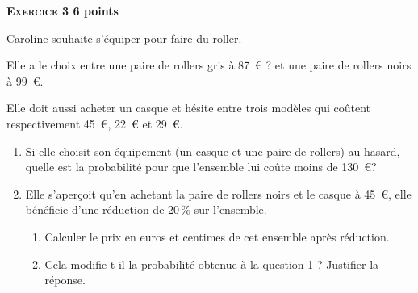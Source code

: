 \textbf{\textsc{Exercice 3} \hfill 6 points}

\medskip

Caroline souhaite s'équiper pour faire du roller.
 
Elle a le choix entre une paire de rollers gris à 87~\euro{} ? et une paire de rollers noirs à 99~\euro.
 
Elle doit aussi acheter un casque et hésite entre trois modèles qui coûtent respectivement 45~\euro, 22~\euro{} et 29~\euro.

\medskip
 
\begin{enumerate}
\item Si elle choisit son équipement (un casque et une paire de rollers) au hasard, quelle est la probabilité pour que l'ensemble lui coûte moins de 130~\euro{}? 
\item Elle s'aperçoit qu'en achetant la paire de rollers noirs et le casque à 45~\euro, elle bénéficie d'une réduction de 20\,\% sur l'ensemble. 
	\begin{enumerate}
		\item Calculer le prix en euros et centimes de cet ensemble après réduction. 
		\item Cela modifie-t-il la probabilité obtenue à la question 1 ? Justifier la réponse.
	\end{enumerate}
\end{enumerate}
 
\bigskip

